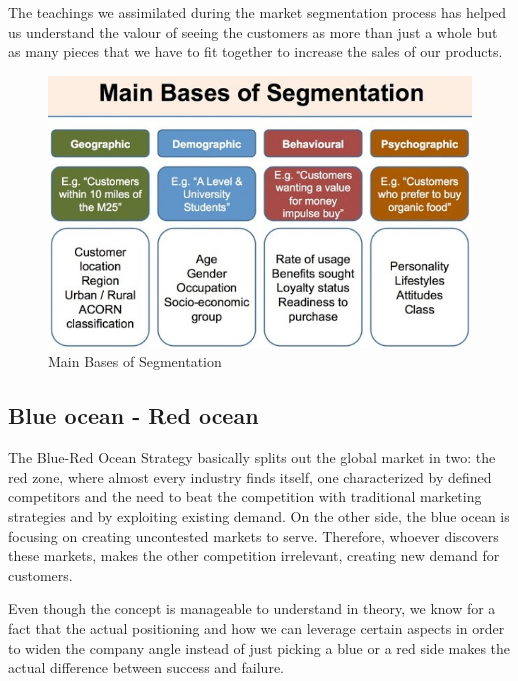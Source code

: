 \documentclass[12p]{article}
\begin{document}
The teachings we assimilated during the market segmentation process has helped us understand the valour of seeing the customers as more than just a whole but as many pieces that we have to fit together to increase the sales of our products.

\begin{figure}
    \centering
    \includegraphics[width=1\textwidth]{market_segmentation}
    \caption{Main Bases of Segmentation \cite{MarketSegmentationBases}}
\end{figure}

\newpage


\subsection{Blue ocean - Red ocean} \label{BlueOceanRedOcean}

The Blue-Red Ocean Strategy basically splits out the global market in two: the red zone, where almost every industry finds itself, one characterized by defined competitors and the need to beat the competition with traditional marketing strategies and by exploiting existing demand.
On the other side, the blue ocean is focusing on creating uncontested markets to serve. Therefore, whoever discovers these markets, makes the other competition irrelevant, creating new demand for customers.\cite{BlueOceanRedOcean}

Even though the concept is manageable to understand in theory, we know for a fact that the actual positioning and how we can leverage certain aspects in order to widen the company angle instead of just picking a blue or a red side makes the actual difference between success and failure.
\end{document}
